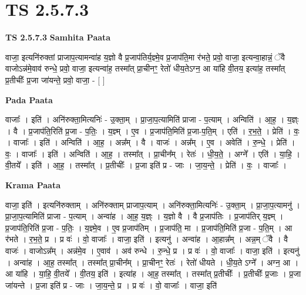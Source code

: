 \documentclass[17pt]{extarticle}
\begin{document}
\section*{ TS 2.5.7.3 }

\textbf{TS 2.5.7.3 } \newline
\textbf{Samhita Paata} \newline

वाजा॒ इत्यनि॑रुक्तां प्राजाप॒त्यामन्वा॑ह य॒ज्ञो वै प्र॒जाप॑तिर्य॒ज्ञ्मे॒व प्र॒जाप॑ति॒मा र॑भते॒ प्रवो॒ वाजा॒ इत्यन्वा॒हान्नं॒ ॅवै वाजोऽन्न॑मे॒वाव॑ रुन्धे॒ प्रवो॒ वाजा॒ इत्यन्वा॑ह॒ तस्मा᳚त् प्रा॒चीनꣳ॒॒ रेतो॑ धीय॒तेऽग्न॒ आ या॑हि वी॒तय॒ इत्या॑ह॒ तस्मा᳚त् प्र॒तीचीः᳚ प्र॒जा जा॑यन्ते॒ प्रवो॒ वाजा॒ - [  ] \newline

\textbf{Pada Paata} \newline

वाजाः᳚ । इति॑ । अनि॑रुक्ता॒मित्यनिः॑ - उ॒क्ता॒म् । प्रा॒जा॒प॒त्यामिति॑ प्राजा - प॒त्याम् । अन्विति॑ । आ॒ह॒ । य॒ज्ञ्ः । वै । प्र॒जाप॑ति॒रिति॑ प्र॒जा - प॒तिः॒ । य॒ज्ञ्म् । ए॒व । प्र॒जाप॑ति॒मिति॑ प्र॒जा-प॒ति॒म् । एति॑ । र॒भ॒ते॒ । प्रेति॑ । वः॒ । वाजाः᳚ । इति॑ । अन्विति॑ । आ॒ह॒ । अन्न᳚म् । वै । वाजः॑ । अन्न᳚म् । ए॒व । अवेति॑ । रु॒न्धे॒ । प्रेति॑ । वः॒ । वाजाः᳚ । इति॑ । अन्विति॑ । आ॒ह॒ । तस्मा᳚त् । प्रा॒चीन᳚म् । रेतः॑ । धी॒य॒ते॒ । अग्ने᳚ । एति॑ । या॒हि॒ । वी॒तये᳚ । इति॑ । आ॒ह॒ । तस्मा᳚त् । प्र॒तीचीः᳚ । प्र॒जा इति॑ प्र - जाः । जा॒य॒न्ते॒ । प्रेति॑ । वः॒ । वाजाः᳚ ।  \newline


\textbf{Krama Paata} \newline

वाजा॒ इति॑ । इत्यनि॑रुक्ताम् । अनि॑रुक्ताम् प्राजाप॒त्याम् । अनि॑रुक्ता॒मित्यनिः॑ - उ॒क्ता॒म् । प्रा॒जा॒प॒त्यामनु॑ । प्रा॒जा॒प॒त्यामिति॑ प्राजा - प॒त्याम् । अन्वा॑ह । आ॒ह॒ य॒ज्ञ्ः । य॒ज्ञो वै । वै प्र॒जाप॑तिः । प्र॒जाप॑तिर् य॒ज्ञ्म् । प्र॒जाप॑ति॒रिति॑ प्र॒जा - प॒तिः॒ । य॒ज्ञ्मे॒व । ए॒व प्र॒जाप॑तिम् । प्र॒जाप॑ति॒ मा । प्र॒जाप॑ति॒मिति॑ प्र॒जा - प॒ति॒म् । आ र॑भते । र॒भ॒ते॒ प्र । प्र वः॑ । वो॒ वाजाः᳚ । वाजा॒ इति॑ । इत्यनु॑ । अन्वा॑ह । आ॒हान्न᳚म् । अन्न॒म् ॅवै । वै वाजः॑ । वाजोऽन्न᳚म् । अन्न॑मे॒व । ए॒वाव॑ । अव॑ रुन्धे । रु॒न्धे॒ प्र । प्र वः॑ । वो॒ वाजाः᳚ । वाजा॒ इति॑ । इत्यनु॑ । अन्वा॑ह । आ॒ह॒ तस्मा᳚त् । तस्मा᳚त् प्रा॒चीन᳚म् । प्रा॒चीनꣳ॒॒ रेतः॑ । रेतो॑ धीयते । धी॒य॒ते ऽग्ने᳚ । अग्न॒ आ । आ या॑हि । या॒हि॒ वी॒तये᳚ । वी॒तय॒ इति॑ । इत्या॑ह । आ॒ह॒ तस्मा᳚त् । तस्मा᳚त् प्र॒तीचीः᳚ । प्र॒तीचीः᳚ प्र॒जाः । प्र॒जा जा॑यन्ते । प्र॒जा इति॑ प्र - जाः । जा॒य॒न्ते॒ प्र । प्र वः॑ । वो॒ वाजाः᳚ । वाजा॒ इति॑ \newline
\end{document}
